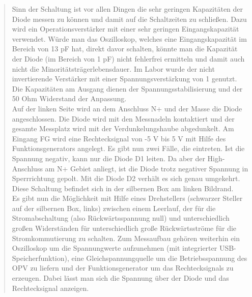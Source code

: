 \begin{quote}
	Sinn der Schaltung ist vor allen Dingen die sehr geringen Kapazitäten der
	Diode messen zu können und damit auf die Schaltzeiten zu schließen. Dazu
	wird ein Operationsverstärker mit einer sehr geringen Eingangskapazität
	verwendet. Würde man das Oszilloskop, welches eine Eingangskapazität im
	Bereich von 13 pF hat, direkt davor schalten, könnte man die Kapazität der
	Diode (im Bereich von 1 pF) nicht fehlerfrei ermitteln und damit auch nicht
	die Minoritätsträgerlebensdauer. Im Labor wurde der nicht invertierende
	Verstärker mit einer Spannungsverstärkung von 1 genutzt. Die Kapazitäten am
	Ausgang dienen der Spannungsstabilisierung und der 50 Ohm Widerstand der
	Anpassung.	\\
	Auf der linken Seite wird an dem Anschluss N+ und der Masse die Diode
	angeschlossen. Die Diode wird mit den Messnadeln kontaktiert und der
	gesamte Messplatz wird mit der Verdunkelungshaube abgedunkelt. Am Eingang
	FG wird eine Rechtecksignal von -5 V bis 5 V mit
	Hilfe des Funktionsgenerators angelegt. Es gibt nun zwei Fälle, die
	eintreten. Ist die Spannung negativ, kann nur die Diode D1 leiten. Da aber
	der High-Anschluss am N+ Gebiet anliegt, ist die Diode trotz negativer
	Spannung in Sperrrichtung gepolt. Mit die Diode D2 verhält es sich genau
	umgekehrt.\\
	Diese Schaltung befindet sich in der silbernen Box am linken Bildrand.\\
	Es gibt nun die Möglichkeit mit Hilfe eines Drehstellers (schwarzer Steller
	auf der silbernen Box, links) zwischen einem Leerlauf, der für die
	Stromabschaltung (also Rückwärtsspannung null) und unterschiedlich großen
	Widerständen für unterschiedlich große Rückwärtsströme für die
	Stromkommutierung zu schalten. Zum Messaufbau gehören weiterhin ein
	Oszilloskop um die Spannungwerte aufzunehmen (mit integrierter USB-
	Speicherfunktion), eine Gleichspannungquelle um die Betriebsspannung des
	OPV zu liefern und der Funktionsgenerator um das Rechtecksignals zu
	erzeugen. Dabei lässt man sich die Spannung über der Diode und das
	Rechtecksignal anzeigen.
 
	\vspace{2em}


\end{quote}
